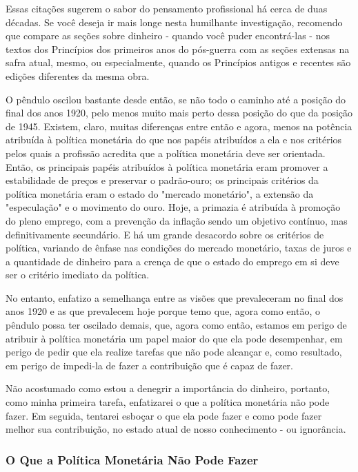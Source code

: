 \documentclass[a4paper,12pt]{article}[abntex2]
\begin{document}
Essas citações sugerem o sabor do pensamento profissional há cerca de duas décadas. Se você deseja ir mais longe nesta humilhante investigação, recomendo que compare as seções sobre dinheiro - quando você puder encontrá-las - nos textos dos Princípios dos primeiros anos do pós-guerra com as seções extensas na safra atual, mesmo, ou especialmente, quando os Princípios antigos e recentes são edições diferentes da mesma obra.

O pêndulo oscilou bastante desde então, se não todo o caminho até a posição do final dos anos 1920, pelo menos muito mais perto dessa posição do que da posição de 1945. Existem, claro, muitas diferenças entre então e agora, menos na potência atribuída à política monetária do que nos papéis atribuídos a ela e nos critérios pelos quais a profissão acredita que a política monetária deve ser orientada. Então, os principais papéis atribuídos à política monetária eram promover a estabilidade de preços e preservar o padrão-ouro; os principais critérios da política monetária eram o estado do "mercado monetário", a extensão da "especulação" e o movimento do ouro. Hoje, a primazia é atribuída à promoção do pleno emprego, com a prevenção da inflação sendo um objetivo contínuo, mas definitivamente secundário. E há um grande desacordo sobre os critérios de política, variando de ênfase nas condições do mercado monetário, taxas de juros e a quantidade de dinheiro para a crença de que o estado do emprego em si deve ser o critério imediato da política.

No entanto, enfatizo a semelhança entre as visões que prevaleceram no final dos anos 1920 e as que prevalecem hoje porque temo que, agora como então, o pêndulo possa ter oscilado demais, que, agora como então, estamos em perigo de atribuir à política monetária um papel maior do que ela pode desempenhar, em perigo de pedir que ela realize tarefas que não pode alcançar e, como resultado, em perigo de impedi-la de fazer a contribuição que é capaz de fazer.

Não acostumado como estou a denegrir a importância do dinheiro, portanto, como minha primeira tarefa, enfatizarei o que a política monetária não pode fazer. Em seguida, tentarei esboçar o que ela pode fazer e como pode fazer melhor sua contribuição, no estado atual de nosso conhecimento - ou ignorância.

\subsubsection{\textbf{O Que a Política Monetária Não Pode Fazer}}
\end{document}
